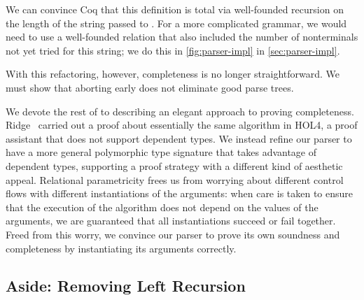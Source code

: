     We can convince Coq that this definition is total via well-founded recursion on the length of the string passed to .  For a more complicated grammar, we would need to use a well-founded relation that also included the number of nonterminals not yet tried for this string; we do this in \autoref{fig:parser-impl} in \autoref{sec:parser-impl}.


    With this refactoring, however, completeness is no longer straightforward.  We must show that aborting early does not eliminate good parse trees.

    We devote the rest of  to describing an elegant approach to proving completeness.  Ridge~\cite{Ridge} carried out a proof about essentially the same algorithm in HOL4, a proof assistant that does not support dependent types.  We instead refine our parser to have a more general polymorphic type signature that takes advantage of dependent types, supporting a proof strategy with a different kind of aesthetic appeal.  Relational parametricity frees us from worrying about different control flows with different instantiations of the arguments: when care is taken to ensure that the execution of the algorithm does not depend on the values of the arguments, we are guaranteed that all instantiations succeed or fail together.  Freed from this worry, we convince our parser to prove its own soundness and completeness by instantiating its arguments correctly.
        
    \subsection{Aside: Removing Left Recursion}
      
